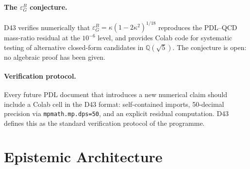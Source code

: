\documentclass[11pt,a4paper]{article}
\theoremstyle{plain}
\theoremstyle{definition}
\theoremstyle{remark}
\newcommand{\epsGeomB}{\varepsilon_G^B}
\begin{document}
\paragraph{The $\epsGeomB$ conjecture.} D43 verifies numerically that $\epsGeomB=\kappa(1-2\kappa^2)^{1/18}$ reproduces the PDL--QCD mass-ratio residual at the $10^{-6}$ level, and provides Colab code for systematic testing of alternative closed-form candidates in $\mathbb{Q}(\sqrt{5})$. The conjecture is \textcolor{conjecturegreen}{open}: no algebraic proof has been given.

\paragraph{Verification protocol.} Every future PDL document that introduces a new numerical claim should include a Colab cell in the D43 format: self-contained imports, 50-decimal precision via \texttt{mpmath.mp.dps=50}, and an explicit residual computation. D43 defines this as the standard verification protocol of the programme.

\section{Epistemic Architecture}
\label{sec:epistemic}
\end{document}
